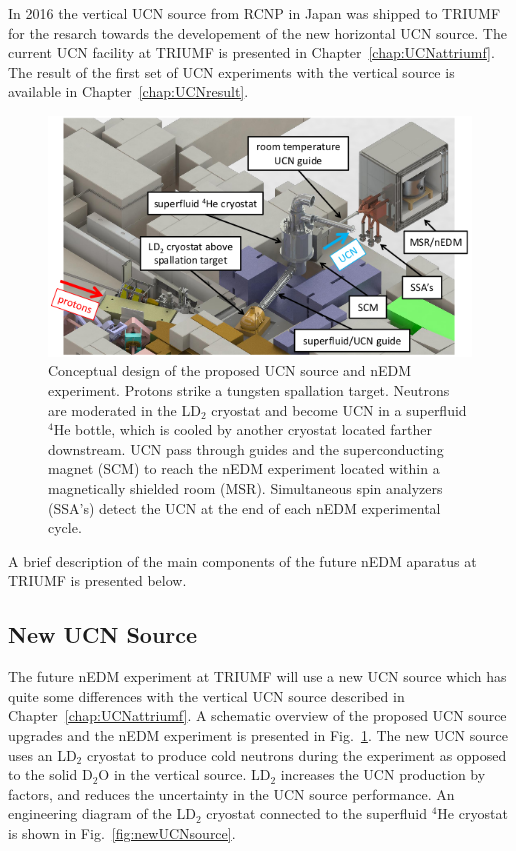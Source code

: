 In 2016 the vertical UCN source from RCNP in Japan was shipped to
TRIUMF for the resarch towards the developement of the new horizontal
UCN source.  The current UCN facility at TRIUMF is presented in
Chapter~\ref{chap:UCNattriumf}. The result of the first set of UCN
experiments with the vertical source is available in
Chapter~\ref{chap:UCNresult}.

\begin{figure}[h!]
  \centering
  \includegraphics[width=1.0\textwidth]{edmtriumf.png}
  \caption{Conceptual design of the proposed UCN source and nEDM
    experiment. Protons strike a tungsten spallation target. Neutrons
    are moderated in the LD$_2$ cryostat and become UCN in a
    superfluid $^4$He bottle, which is cooled by another cryostat
    located farther downstream. UCN pass through guides and the
    superconducting magnet (SCM) to reach the nEDM experiment located
    within a magnetically shielded room (MSR). Simultaneous spin
    analyzers (SSA’s) detect the UCN at the end of each nEDM
    experimental cycle.  }
  \label{fig:triumfEDM}
\end{figure}

A brief description of the main
components of the future nEDM aparatus at TRIUMF is presented below.

\subsection{New UCN Source}
The future nEDM experiment at TRIUMF will use a new UCN source which
has quite some differences with the vertical UCN source described in
Chapter~\ref{chap:UCNattriumf}. A schematic overview of the proposed
UCN source upgrades and the nEDM experiment is presented in
Fig.~\ref{fig:triumfEDM}. The new UCN source uses an LD$_2$ cryostat
to produce cold neutrons during the experiment as opposed to the solid
D$_2$O in the vertical source. LD$_2$ increases the UCN production by
factors, and reduces the uncertainty in the UCN source performance. An
engineering diagram of the LD$_2$ cryostat connected to the superfluid
$^4$He cryostat is shown in Fig.~\ref{fig:newUCNsource}.

